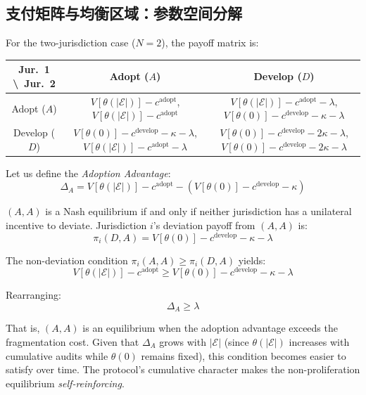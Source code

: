 \documentclass[12pt,a4paper]{ctexart}
\theoremstyle{definition}
\theoremstyle{remark}
\begin{document}
\subsection{支付矩阵与均衡区域：参数空间分解}

For the two-jurisdiction case ($N=2$), the payoff matrix is:

\begin{table}[htbp]
\centering
\begin{tabular}{@{}c|cc@{}}
\toprule
Jur.\ 1 \textbackslash\ Jur.\ 2 & Adopt ($A$) & Develop ($D$) \\
\midrule
Adopt ($A$) & $V[\theta(|\mathcal{E}|)] - c^{\text{adopt}}$, $V[\theta(|\mathcal{E}|)] - c^{\text{adopt}}$ & $V[\theta(|\mathcal{E}|)] - c^{\text{adopt}} - \lambda$, $V[\theta(0)] - c^{\text{develop}} - \kappa - \lambda$ \\[4pt]
Develop ($D$) & $V[\theta(0)] - c^{\text{develop}} - \kappa - \lambda$, $V[\theta(|\mathcal{E}|)] - c^{\text{adopt}} - \lambda$ & $V[\theta(0)] - c^{\text{develop}} - 2\kappa - \lambda$, $V[\theta(0)] - c^{\text{develop}} - 2\kappa - \lambda$ \\
\bottomrule
\end{tabular}
\end{table}

Let us define the \textit{Adoption Advantage}:
\begin{equation}
\Delta_A = V[\theta(|\mathcal{E}|)] - c^{\text{adopt}} - \left( V[\theta(0)] - c^{\text{develop}} - \kappa \right)
\end{equation}

$(A, A)$ is a Nash equilibrium if and only if neither jurisdiction has a unilateral incentive to deviate. Jurisdiction $i$'s deviation payoff from $(A, A)$ is:
\begin{equation}
\pi_i(D, A) = V[\theta(0)] - c^{\text{develop}} - \kappa - \lambda
\end{equation}

The non-deviation condition $\pi_i(A, A) \geq \pi_i(D, A)$ yields:
\begin{equation}
V[\theta(|\mathcal{E}|)] - c^{\text{adopt}} \geq V[\theta(0)] - c^{\text{develop}} - \kappa - \lambda
\end{equation}

Rearranging:
\begin{equation}
\Delta_A \geq \lambda
\end{equation}

That is, $(A, A)$ is an equilibrium when the adoption advantage exceeds the fragmentation cost. Given that $\Delta_A$ grows with $|\mathcal{E}|$ (since $\theta(|\mathcal{E}|)$ increases with cumulative audits while $\theta(0)$ remains fixed), this condition becomes easier to satisfy over time. The protocol's cumulative character makes the non-proliferation equilibrium \textit{self-reinforcing}.
\end{document}
